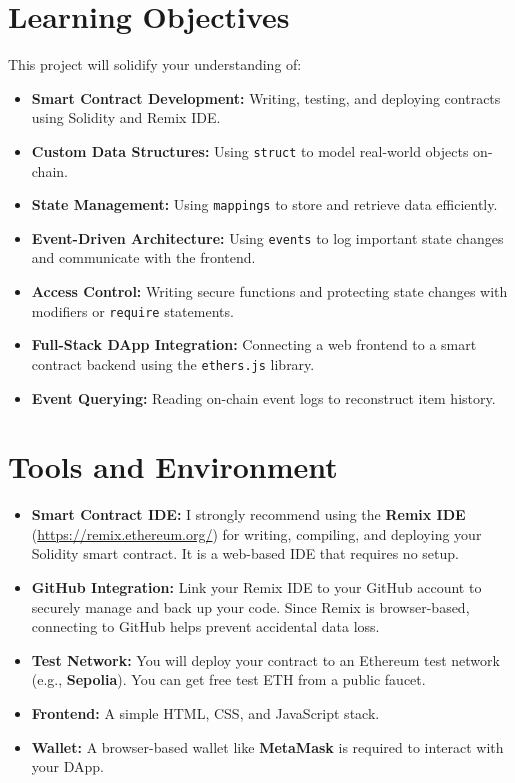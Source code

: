 \documentclass[12pt]{extarticle}
\begin{document}
\section*{Learning Objectives}
This project will solidify your understanding of:
\begin{itemize}
    \item \textbf{Smart Contract Development:} Writing, testing, and deploying contracts using Solidity and Remix IDE.
    \item \textbf{Custom Data Structures:} Using \texttt{struct} to model real-world objects on-chain.
    \item \textbf{State Management:} Using \texttt{mappings} to store and retrieve data efficiently.
    \item \textbf{Event-Driven Architecture:} Using \texttt{events} to log important state changes and communicate with the frontend.
    \item \textbf{Access Control:} Writing secure functions and protecting state changes with modifiers or \texttt{require} statements.
    \item \textbf{Full-Stack DApp Integration:} Connecting a web frontend to a smart contract backend using the \texttt{ethers.js} library.
    \item \textbf{Event Querying:} Reading on-chain event logs to reconstruct item history.
\end{itemize}

\section*{Tools and Environment}
\begin{itemize}
    \item \textbf{Smart Contract IDE:} I strongly recommend using the \textbf{Remix IDE} (\url{https://remix.ethereum.org/}) for writing, compiling, and deploying your Solidity smart contract. It is a web-based IDE that requires no setup.
    \item \textbf{GitHub Integration:} Link your Remix IDE to your GitHub account to securely manage and back up your code. Since Remix is browser-based, connecting to GitHub helps prevent accidental data loss.
    \item \textbf{Test Network:} You will deploy your contract to an Ethereum test network (e.g., \textbf{Sepolia}). You can get free test ETH from a public faucet.
    \item \textbf{Frontend:} A simple HTML, CSS, and JavaScript stack.
    \item \textbf{Wallet:} A browser-based wallet like \textbf{MetaMask} is required to interact with your DApp.
\end{itemize}
\end{document}
